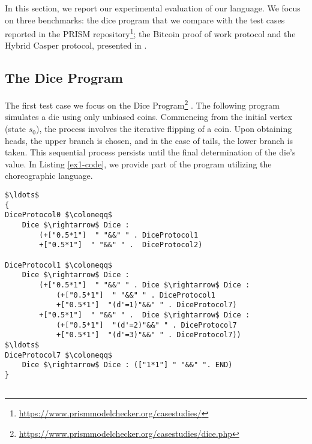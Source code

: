 In  this section, we report our experimental evaluation of our language. 
We focus on three benchmarks: the dice program that we compare with the  
test cases reported in the PRISM repository\footnote{\url{https://www.prismmodelchecker.org/casestudies/}}; 
the Bitcoin proof of work protocol and the Hybrid Casper protocol, 
presented in \cite{DBLP:journals/concurrency/BistarelliNGLMV23,DBLP:journals/distribledger/GallettaLMV23}.

\subsection{The Dice Program}
 The first test case we focus on the Dice Program\footnote{\url{https://www.prismmodelchecker.org/casestudies/dice.php}} \cite{KY76}.
 The following program simulates a die using only unbiased coins. Commencing from the initial vertex (state $s_0$), the process involves the iterative flipping of a coin. Upon obtaining heads, the upper branch is chosen, and in the case of tails, the lower branch is taken. This sequential process persists until the final determination of the die's value.
 In Listing \ref{ex1-code}, we provide part of the program utilizing the choreographic language. %


\begin{lstlisting}[style=chor-color,caption={Choreographic language for the Dice Program.},captionpos=b,label={ex1-code}]
$\ldots$
{
DiceProtocol0 $\coloneqq$ 
	Dice $\rightarrow$ Dice :
		(+["0.5*1"]  " "&&" " . DiceProtocol1
		+["0.5*1"]  " "&&" " .  DiceProtocol2)

DiceProtocol1 $\coloneqq$
	Dice $\rightarrow$ Dice :
		(+["0.5*1"]  " "&&" " . Dice $\rightarrow$ Dice : 
			(+["0.5*1"]  " "&&" " . DiceProtocol1
			+["0.5*1"]  "(d'=1)"&&" " . DiceProtocol7)
		+["0.5*1"]  " "&&" " .  Dice $\rightarrow$ Dice : 
			(+["0.5*1"]  "(d'=2)"&&" " . DiceProtocol7
			+["0.5*1"]  "(d'=3)"&&" " . DiceProtocol7))
$\ldots$
DiceProtocol7 $\coloneqq$
	Dice $\rightarrow$ Dice : (["1*1"] " "&&" ". END)
}
	
\end{lstlisting}

